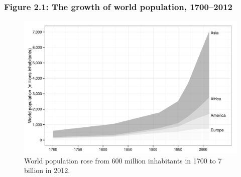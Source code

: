 \documentclass[t]{beamer}\usepackage[]{graphicx}\usepackage[]{color}
\newenvironment{knitrout}{}{} %
\begin{document}
\begin{frame}[label=Figure_2_1]
\frametitle{Figure 2.1: The growth of world population, 1700--2012}
\begin{figure}[t]
\begin{minipage}[b]{\textwidth}
\centering
\begin{knitrout}\footnotesize
{}\color{fgcolor}

{\centering \includegraphics[width=1\linewidth]{figures/bw/Figure_2_1} 

}



\end{knitrout}
\caption{World population rose from 600 million inhabitants in 1700 to 7 billion in 2012.}
\end{minipage}
\end{figure}
\end{frame}
\end{document}
